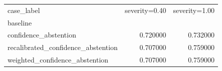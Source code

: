 \begin{tabular}{lrr}
\toprule
case_label & severity=0.40 & severity=1.00 \\
baseline &  &  \\
\midrule
confidence_abstention & 0.720000 & 0.732000 \\
recalibrated_confidence_abstention & 0.707000 & 0.759000 \\
weighted_confidence_abstention & 0.707000 & 0.759000 \\
\bottomrule
\end{tabular}
